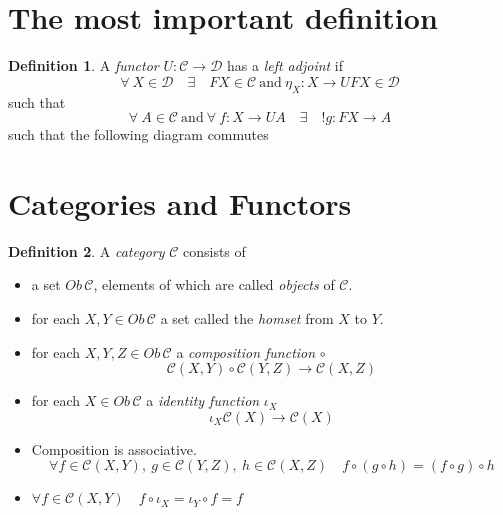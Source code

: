 \documentclass{article}
\theoremstyle{definition}
\newtheorem{definition}{Definition}[section]
\begin{document}
\section{The most important definition}
\begin{definition}
	A \textit{functor} $U : \mathcal{C} \rightarrow \mathcal{D}$ has a \textit{left adjoint} if
		$$
		\forall\ X \in \mathcal{D}
		\quad\exists\quad
		FX \in \mathcal{C} \ \textrm{and}\ \eta_X : X \rightarrow UFX \in \mathcal{D}
		$$
		such that
		$$
		\forall\ A \in \mathcal{C}\ \textrm{and}\ \forall\ f : X \rightarrow UA
		\quad\exists\quad
		!g : FX \rightarrow A
		$$
		such that the following diagram commutes
\end{definition}

\begin{center}
\end{center}

\section{Categories and Functors}

\begin{definition}
	A \textit{category} $\mathcal{C}$ consists of
	\begin{itemize}
		\item a set $Ob\,\mathcal{C}$, elements of which are called \textit{objects} of $\mathcal{C}$.
		\item for each $X, Y \in Ob\,\mathcal{C}$ a set called the \textit{homset} from $X$ to $Y$.
		\item for each $X, Y, Z \in Ob\,\mathcal{C}$ a \textit{composition function} $\circ$
			$$\mathcal{C}(X,Y) \circ \mathcal{C}(Y,Z) \rightarrow \mathcal{C}(X,Z)$$
		\item for each $X \in Ob\,\mathcal{C}$ a \textit{identity function} $\iota_X$
			$$\iota_X \mathcal{C}(X) \rightarrow \mathcal{C}(X)$$
			\begin{center}
			\end{center}
		\item Composition is associative.
			$$\forall
			f \in \mathcal{C}(X,Y),\ 
			g \in \mathcal{C}(Y,Z),\ 
			h \in \mathcal{C}(X,Z)\quad
			f \circ (g \circ h) = (f \circ g) \circ h
			$$
			\begin{center}
			\end{center}
		\item $\forall f \in \mathcal{C}(X,Y)\quad f \circ \iota_X = \iota_Y \circ f = f$
	\end{itemize}
\end{definition}
\end{document}
